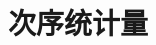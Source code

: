 \documentclass[12pt,uft8]{ctexrep}
\newcommand{\dif}{\mathop{}\!\mathrm{d}}
\begin{document}
\section{次序统计量}






\end{document}
